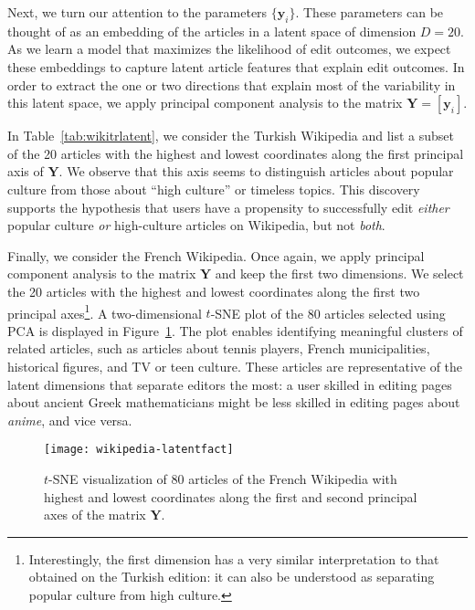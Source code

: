 \documentclass[format=sigconf]{acmart}
\begin{document}
Next, we turn our attention to the parameters $\{ \bm{y}_i \}$.
These parameters can be thought of as an embedding of the articles in a latent space of dimension $D = 20$.
As we learn a model that maximizes the likelihood of edit outcomes, we expect these embeddings to capture latent article features that explain edit outcomes.
In order to extract the one or two directions that explain most of the variability in this latent space, we apply principal component analysis \citep{bishop2006pattern} to the matrix $\bm{Y} = [\bm{y}_i]$.

In Table~\ref{tab:wikitrlatent}, we consider the Turkish Wikipedia and list a subset of the \num{20} articles with the highest and lowest coordinates along the first principal axis of $\bm{Y}$.
We observe that this axis seems to distinguish articles about popular culture from those about ``high culture'' or timeless topics.
This discovery supports the hypothesis that users have a propensity to successfully edit \emph{either} popular culture \emph{or} high-culture articles on Wikipedia, but not \emph{both}.

Finally, we consider the French Wikipedia.
Once again, we apply principal component analysis to the matrix $\bm{Y}$ and keep the first two dimensions.
We select the \num{20} articles with the highest and lowest coordinates along the first two principal axes\footnote{%
Interestingly, the first dimension has a very similar interpretation to that obtained on the Turkish edition: it can also be understood as separating popular culture from high culture.}.
A two-dimensional $t$-SNE plot \citep{vandermaaten2008visualizing} of the 80 articles selected using PCA is displayed in Figure~\ref{fig:wikifrlatent}.
The plot enables identifying meaningful clusters of related articles, such as articles about tennis players, French municipalities, historical figures, and TV or teen culture.
These articles are representative of the latent dimensions that separate editors the most:
a user skilled in editing pages about ancient Greek mathematicians might be less skilled in editing pages about \emph{anime}, and vice versa.

\begin{figure}
\texttt{[image: wikipedia-latentfact]}
\caption{$t$-SNE visualization of 80 articles of the French Wikipedia with highest and lowest coordinates along the first and second principal axes of the matrix $\bm{Y}$.}
\label{fig:wikifrlatent}
\end{figure}
\end{document}

